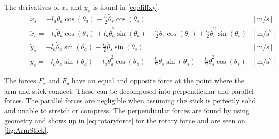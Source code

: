 The derivatives of $x_s$ and $y_s$ is found in \autoref{eq:diffxy}.
\begin{subequations}\label{eq:diffxy} 
\begin{flalign}
\hspace{30pt} & \dot{x}_s=-l_a\dot{\theta}_a\cos(\theta_a)-\frac{l_s}{2}\dot{\theta}_s\cos(\theta_s) & [\si{\meter\per\second}] \\
& \ddot{x}_s=-l_a\ddot{\theta}_a\cos(\theta_a)+l_a\dot{\theta}_a^2\sin(\theta_a)-\frac{l_s}{2}\ddot{\theta}_s\cos(\theta_s)+\frac{l_s}{2}\dot{\theta}_s^2\sin(\theta_s) & [\si{\meter\per\square\second}] \\
& \dot{y}_s=-l_a \dot{\theta}_a\sin(\theta_a)-\frac{l_s}{2}\dot{\theta}_s\sin(\theta_s) & [\si{\meter\per\second}] \\
& \ddot{y}_s=-l_a\ddot{\theta}_a\sin(\theta_a)-l_a\dot{\theta}_a^2\cos(\theta_a)-\frac{l_s}{2}\ddot{\theta}_s\sin(\theta_s)-\frac{l_s}{2}\dot{\theta}_s^2\cos(\theta_s) & [\si{\meter\per\square\second}]
\end{flalign}
\end{subequations}

The forces $F_x$ and $F_y$ have an equal and opposite force at the point where the arm and stick connect. These can be decomposed into perpendicular and parallel forces. The parallel forces are negligible when assuming the stick is perfectly solid and unable to stretch or compress. The perpendicular forces are found by using geometry and shows up in \autoref{eq:rotaryforce} for the rotary force and are seen on \autoref{fig:ArmStick}.



